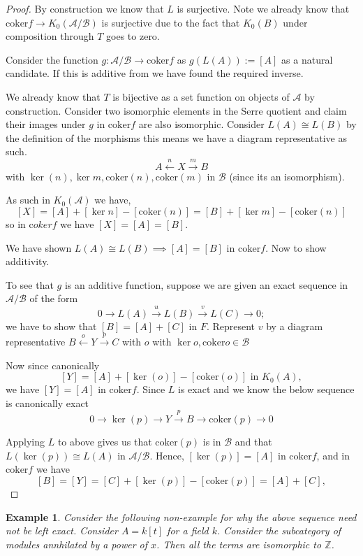 \documentclass[12pt]{report}
\numberwithin{equation}{section}
\newcommand{\coker}{{\mathrm{coker}}}
\newtheorem{example}[dummy]{Example}
\begin{document}
	\begin{proof}
		By construction we know that $L$ is surjective.
		Note we already know that $\mathrm{coker} f \to  K_0(\mathcal{A/B})$ is surjective due to the fact that $K_0(B) $ under composition through $T$ goes to zero.
		
		Consider the function $g:\mathcal{A/B} \to \mathrm{coker}f$ as $g(L(A)):=[A]$ as a natural candidate. If this is additive from we have found the required inverse.
		
		We already know that $T $ is bijective as a set function on objects of $\mathcal{A}$ by construction. Consider two isomorphic elements in the Serre quotient and claim their images under $g$ in $\mathrm{coker} f $ are also isomorphic. Consider $L(A) \cong L(B)$ by the definition of the morphisms this means we have a diagram representative as such.
		\[ A \xleftarrow{n} X \xrightarrow{m} B \] with $\ker(n), \ker{m}, \mathrm{coker} (n) , \mathrm{coker}(m)$ in $\mathcal{B}$ (since its an isomorphism).
		
			As such in $K_0(\mathcal{A})$ we have, $$[X]=[A]+[\ker n]-[\mathrm{coker}(n)]=[B]+[\ker m]- [\mathrm{coker}(n)]$$ so in $\mathrm coker f$ we have $[X] = [A]=[B]$.
			
		We have shown $L(A) \cong L(B) \implies [A]=[B]$ in $\mathrm{coker} f$. Now to show additivity.
		
		To see that \( g \) is an additive function, suppose we are given an exact sequence in \( \mathcal{A/B} \) of the form
		\[
		0 \rightarrow L(A) \xrightarrow{u	} L(B) \xrightarrow{v} L(C) \rightarrow 0;
		\]
		we have to show that \( [B] = [A] + [C] \) in \( F \). Represent \( v \) by a diagram representative \( B \xleftarrow{o} Y \xrightarrow{p}	 C \) with \( o \) with $\ker o , \coker o \in \mathcal{B}$
		
		Now since canonically
		\[
		[Y] = [A] + [\ker(o)] - [\coker(o)] \text{ in } K_0(A),
		\]
		we have \( [Y] = [A] \) in \( \coker f \). Since \( L \) is exact and we know the below sequence is canonically exact
		\[
		0 \rightarrow \ker(p) \rightarrow Y \xrightarrow{p} B \rightarrow \coker(p) \rightarrow 0	\]
	
		Applying $L $ to above gives us that \( \coker(p) \) is in \( \mathcal B \) and that \( L(\ker(p)) \cong L(A) \) in \( \mathcal{A/B} \). Hence, \( [\ker(p)] = [A] \) in \( \coker f \), and in \( \coker f \) we have
		\[
		[B] = [Y] = [C] + [\ker(p)] - [\coker(p)] = [A] + [C],
		\]
	\end{proof}
	\begin{example}
		Consider the following non-example for why the above sequence need not be left exact.
		 Consider $A=k[t]$ for a field $k$. Consider the subcategory of modules annhilated by a power of $x$. Then all the terms are isomorphic to $\mathbb{Z}$.
	\end{example}
\end{document}

